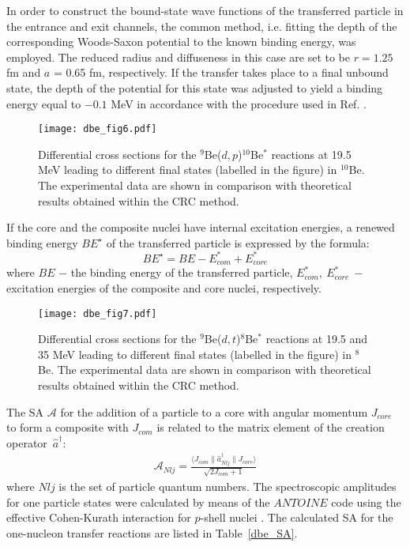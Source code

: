 \documentclass[
12pt, %
oneside, %
english, %
onehalfspacing, %
onehalfspacing, %
headsepline, %
]{MastersDoctoralThesis} %
\begin{document}
In order to construct the bound-state wave functions of the transferred particle in the entrance and exit channels, the common method, i.e. fitting the depth of the corresponding Woods-Saxon potential to the known binding energy, was employed. The reduced radius and diffuseness in this case are set to be $r = 1.25$ fm and $a$ = 0.65 fm, respectively. If the transfer takes place to a final unbound state, the depth of the potential for this state was adjusted to yield a binding energy equal to $-0.1$ MeV in accordance with the procedure used in Ref. \cite{harakeh1980strong}.

\begin{figure}[tp]
\centering
\texttt{[image: dbe\_fig6.pdf]}
\decoRule
\caption{\label{dbe_fig6} \footnotesize Differential cross sections for the ${}^9$Be($d,p$)${}^{10}$Be$^*$ reactions at 19.5 MeV leading to different final states (labelled in the figure) in ${}^{10}$Be. The experimental data are shown in comparison with theoretical results obtained within the CRC method.}
\end{figure}

If the core and the composite nuclei have internal excitation energies, a renewed binding energy $BE^{\star}$ of the transferred particle is expressed by the formula:
\begin{equation} BE^{\star}=BE - E_{com}^*+E_{core}^* \end{equation}
where $BE$ $-$ the binding energy of the transferred particle, $E_{com}^*,~E_{core}^*~-$  excitation energies of the composite and  core nuclei, respectively.

\begin{figure}[tp]
\centering
\texttt{[image: dbe\_fig7.pdf]}
\decoRule
\caption{
\label{dbe_fig7}
\footnotesize Differential cross sections for the ${}^9$Be($d,t$)${}^{8}$Be$^*$ reactions at 19.5 and 35 MeV leading to different final states (labelled in the figure) in ${}^{8}$Be. The experimental data are shown in comparison with  theoretical results obtained within the CRC method.}
\end{figure}

The SA  $\mathcal{A}$ for the addition of a particle to a core with angular momentum $J_{core}$ to form a composite with $J_{com}$ is related to the matrix element of the creation operator~$\hat{a}^\dagger$:
\begin{eqnarray}\label{eq:SA}
\mathcal{A}_{Nlj} = \frac{\langle J_{com} \| \hat{a}^\dagger _{Nlj} \| J_{core}  \rangle}{\sqrt{2J_{com}+1}}
\end{eqnarray}
where $Nlj$ is the set of particle quantum numbers. The spectroscopic amplitudes for one particle states were calculated by means of the $ANTOINE$ code \cite{antoine}  using the effective Cohen-Kurath interaction for $p$-shell nuclei \cite{cohen1965}. The calculated SA for the one-nucleon transfer reactions are listed in Table~\ref{dbe_SA}.
\end{document}
